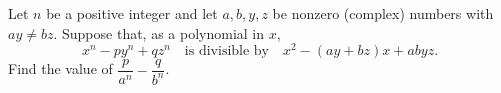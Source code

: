Let $n$ be a positive integer and let $a,b,y,z$ be nonzero (complex) numbers with $ay\ne bz$. Suppose that, as a polynomial in $x$,
\[
x^n-py^n+qz^n\quad\text{is divisible by}\quad x^2-(ay+bz)x+abyz .
\]
Find the value of $\dfrac{p}{a^n}-\dfrac{q}{b^n}$.

